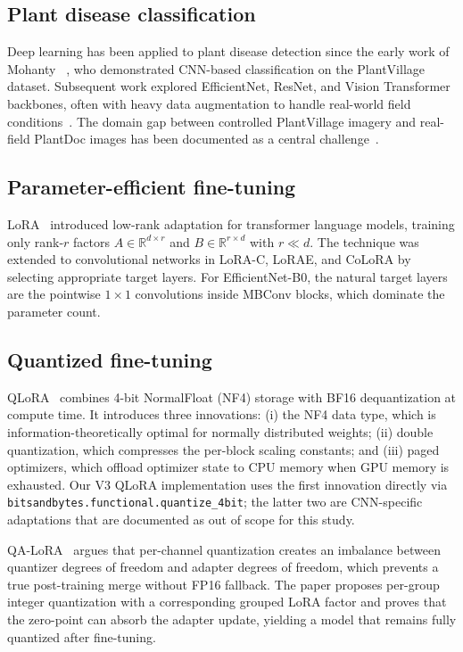 \documentclass[conference]{IEEEtran}
\begin{document}
\subsection{Plant disease classification}
Deep learning has been applied to plant disease detection since the early work of Mohanty \etal~\cite{mohanty2016plantvillage}, who demonstrated CNN-based classification on the PlantVillage dataset. Subsequent work explored EfficientNet, ResNet, and Vision Transformer backbones, often with heavy data augmentation to handle real-world field conditions~\cite{ferentinos2018deepplant, fuentes2017robust}. The domain gap between controlled PlantVillage imagery and real-field PlantDoc images has been documented as a central challenge~\cite{bhattarai2024newplantdoc}.

\subsection{Parameter-efficient fine-tuning}
LoRA~\cite{hu2021lora} introduced low-rank adaptation for transformer language models, training only rank-$r$ factors $A\in\mathbb{R}^{d\times r}$ and $B\in\mathbb{R}^{r\times d}$ with $r \ll d$. The technique was extended to convolutional networks in LoRA-C, LoRAE, and CoLoRA by selecting appropriate target layers. For EfficientNet-B0, the natural target layers are the pointwise $1\times 1$ convolutions inside MBConv blocks, which dominate the parameter count.

\subsection{Quantized fine-tuning}
QLoRA~\cite{dettmers2023qlora} combines 4-bit NormalFloat (NF4) storage with BF16 dequantization at compute time. It introduces three innovations: (i) the NF4 data type, which is information-theoretically optimal for normally distributed weights; (ii) double quantization, which compresses the per-block scaling constants; and (iii) paged optimizers, which offload optimizer state to CPU memory when GPU memory is exhausted. Our V3 QLoRA implementation uses the first innovation directly via \texttt{bitsandbytes.functional.quantize\_4bit}; the latter two are CNN-specific adaptations that are documented as out of scope for this study.

QA-LoRA~\cite{xu2024qalora} argues that per-channel quantization creates an imbalance between quantizer degrees of freedom and adapter degrees of freedom, which prevents a true post-training merge without FP16 fallback. The paper proposes per-group integer quantization with a corresponding grouped LoRA factor and proves that the zero-point can absorb the adapter update, yielding a model that remains fully quantized after fine-tuning.
\end{document}
